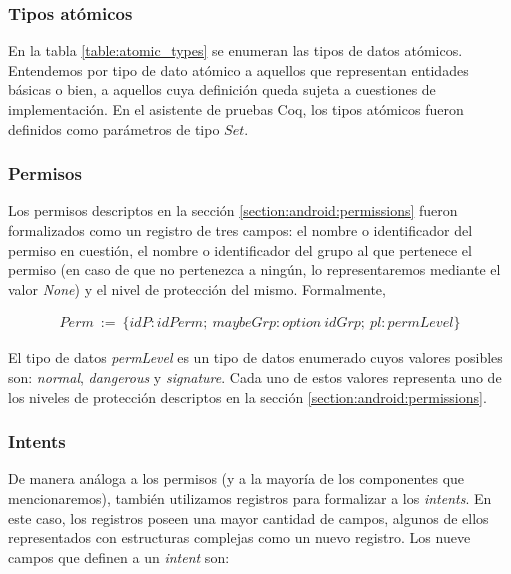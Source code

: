 \subsubsection*{Tipos atómicos}
En la tabla \ref{table:atomic_types} se enumeran las tipos de datos atómicos. Entendemos por tipo de
dato atómico a aquellos que representan entidades básicas o bien, a aquellos cuya definición queda
sujeta a cuestiones de implementación. En el asistente de pruebas Coq, los tipos atómicos fueron
definidos como parámetros de tipo $Set$.



\subsubsection*{Permisos}
Los permisos descriptos en la sección \ref{section:android:permissions} fueron formalizados como un
registro de tres campos: el nombre o identificador del permiso en cuestión, el nombre o
identificador del grupo al que pertenece el permiso (en caso de que no pertenezca a ningún, lo
representaremos mediante el valor \textit{None}) y el nivel de protección del mismo. Formalmente,

\begin{align*}
    Perm\ :=\ \{ idP: idPerm;\ maybeGrp: option\ idGrp;\ pl: permLevel \}
\end{align*}

El tipo de datos \textit{permLevel} es un tipo de datos enumerado cuyos valores posibles son:
\textit{normal}, \textit{dangerous} y \textit{signature}. Cada uno de estos valores representa uno
de los niveles de protección descriptos en la sección \ref{section:android:permissions}.

\subsubsection*{Intents}
De manera análoga a los permisos (y a la mayoría de los componentes que mencionaremos), también
utilizamos registros para formalizar a los \textit{intents}. En este caso, los registros poseen una
mayor cantidad de campos, algunos de ellos representados con estructuras complejas como un nuevo
registro. Los nueve campos que definen a un \textit{intent} son:

